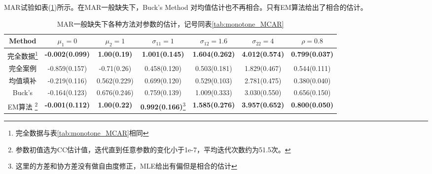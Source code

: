 \documentclass[aps,pre,12pt,preprint,onecolumn,showpacs,showkeys,AutoFakeBold]{revtex4-1}
\begin{document}
MAR试验如表(\ref{tab:both_MAR})所示。在MAR一般缺失下，Buck's Method 对均值估计也不再相合。只有EM算法给出了相合的估计。
\begin{table}[h]
    \caption{\label{tab:both_MAR}%
    MAR一般缺失下各种方法对参数的估计，记号同表\ref{tab:monotone_MCAR}}
    \begin{tabular}{|c|c|c|c|c|c|c|}
        \hline
        Method&$\mu _1=0$ &$\mu _2=1$&$\sigma _{11}=1$&$\sigma _{12}=1.6$&$\sigma _{22}=4$&$\rho=0.8$\\\hline
        完全数据\footnote{完全数据与表\ref{tab:monotone_MCAR}相同}&\textbf{-0.002(0.099)}&\textbf{1.00(0.19)}&\textbf{1.001(0.145)}&\textbf{1.604(0.262)}&\textbf{4.012(0.574)}&\textbf{0.799(0.037)}\\\hline
        完全案例&-0.859(0.157)&-0.71(0.26)&0.458(0.120)&0.503(0.181)&1.829(0.467)&0.544(0.111)\\\hline
        均值填补&-0.219(0.116)&0.562(0.229)&0.699(0.120)&0.529(0.103)&2.781(0.475)&0.380(0.040)\\\hline
        Buck's&-0.164(0.123)&0.676(0.246)&0.759(0.139)&1.009(0.333)&3.030(0.550)&0.656(0.150)\\\hline
        EM算法
        \footnote{参数初值选为CC估计值，迭代直到任意参数的变化小于1e-7，平均迭代次数约为51.5次。}
        &\textbf{-0.001(0.112)}&\textbf{1.00(0.22)}&\textbf{0.992(0.166)}\footnote{这里的方差和协方差没有做自由度修正，MLE给出有偏但是相合的估计}&\textbf{1.585(0.276)}&\textbf{3.957(0.652)}&\textbf{0.800(0.050)}\\\hline
    \end{tabular}
\end{table}
\end{document}

